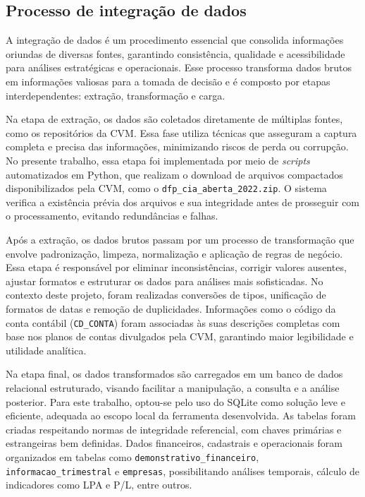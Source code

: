 \subsection{Processo de integração de dados}

A integração de dados é um procedimento essencial que consolida informações oriundas de diversas fontes, garantindo consistência, qualidade e acessibilidade para análises estratégicas e operacionais. Esse processo transforma dados brutos em informações valiosas para a tomada de decisão e é composto por etapas interdependentes: extração, transformação e carga.

Na etapa de extração, os dados são coletados diretamente de múltiplas fontes, como os repositórios da CVM. Essa fase utiliza técnicas que asseguram a captura completa e precisa das informações, minimizando riscos de perda ou corrupção. No presente trabalho, essa etapa foi implementada por meio de \textit{scripts} automatizados em Python, que realizam o download de arquivos compactados disponibilizados pela CVM, como o \texttt{dfp\_cia\_aberta\_2022.zip}. O sistema verifica a existência prévia dos arquivos e sua integridade antes de prosseguir com o processamento, evitando redundâncias e falhas.

Após a extração, os dados brutos passam por um processo de transformação que envolve padronização, limpeza, normalização e aplicação de regras de negócio. Essa etapa é responsável por eliminar inconsistências, corrigir valores ausentes, ajustar formatos e estruturar os dados para análises mais sofisticadas. No contexto deste projeto, foram realizadas conversões de tipos, unificação de formatos de datas e remoção de duplicidades. Informações como o código da conta contábil (\texttt{CD\_CONTA}) foram associadas às suas descrições completas com base nos planos de contas divulgados pela CVM, garantindo maior legibilidade e utilidade analítica.

Na etapa final, os dados transformados são carregados em um banco de dados relacional estruturado, visando facilitar a manipulação, a consulta e a análise posterior. Para este trabalho, optou-se pelo uso do SQLite como solução leve e eficiente, adequada ao escopo local da ferramenta desenvolvida. As tabelas foram criadas respeitando normas de integridade referencial, com chaves primárias e estrangeiras bem definidas. Dados financeiros, cadastrais e operacionais foram organizados em tabelas como \texttt{demonstrativo\_financeiro}, \texttt{informacao\_trimestral} e \texttt{empresas}, possibilitando análises temporais, cálculo de indicadores como LPA e P/L, entre outros.

